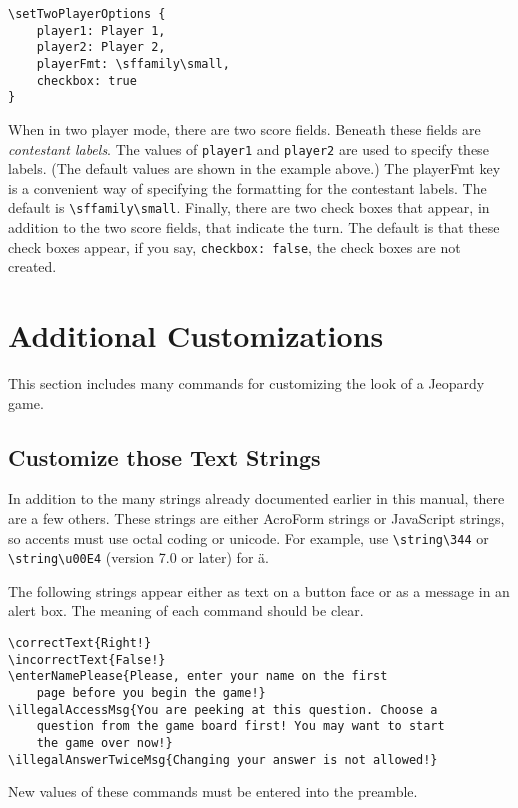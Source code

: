 \documentclass{article}
\begin{document}
\begin{Verbatim}[xleftmargin=\amtIndent,fontsize=\small]
\setTwoPlayerOptions {
    player1: Player 1,
    player2: Player 2,
    playerFmt: \sffamily\small,
    checkbox: true
}
\end{Verbatim}
When in two player mode, there are two score fields. Beneath these fields are \emph{contestant labels}. The values
of \texttt{player1} and \texttt{player2} are used to specify these labels. (The default values are shown in
the example above.) The playerFmt key is a convenient way of specifying the formatting for the contestant
labels. The default is \verb!\sffamily\small!. Finally, there are two check boxes that appear, in addition to
the two score fields, that indicate the turn. The default is that these check boxes appear, if you say,
\texttt{checkbox: false}, the check boxes are not created.


\section{Additional Customizations}

This section includes many commands for customizing
the look of a Jeopardy game.

\subsection{Customize those Text Strings}

In addition to the many strings already documented earlier in this
manual, there are a few others. These strings are either AcroForm
strings or JavaScript strings, so accents must use octal coding or
unicode. For example, use \verb!\string\344! or \verb!\string\u00E4!
(version 7.0 or later) for \"{a}.

The following strings appear either as text on a button face or as a message
in an alert box. The meaning of each command should be clear.
\begin{Verbatim}[xleftmargin=\amtIndent,fontsize=\small]
\correctText{Right!}
\incorrectText{False!}
\enterNamePlease{Please, enter your name on the first
    page before you begin the game!}
\illegalAccessMsg{You are peeking at this question. Choose a
    question from the game board first! You may want to start
    the game over now!}
\illegalAnswerTwiceMsg{Changing your answer is not allowed!}
\end{Verbatim}
New values of these commands must be entered into the preamble.
\end{document}
